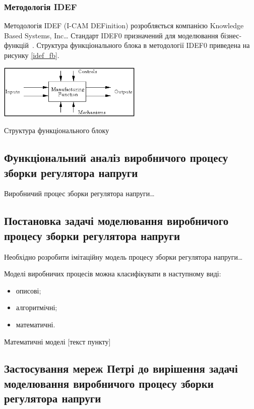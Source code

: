\subsubsection{Методологія IDEF}
Методологія IDEF (I-CAM DEFinition) розробляється компанією Knowledge Based Systems, Inc\ldots
Стандарт IDEF0 призначений для моделювання
бізнес-функцій~\cite{Sommerville_2010}. Структура функціонального блока в методології IDEF0 приведена на рисунку
\ref{idef_fb}.

\begin{stdfigure}
\includegraphics[width=2.7in]{images/idef_fb.png}
\caption{Структура функціонального блоку}
\label{idef_fb}
\end{stdfigure}

\subsection{Функціональний аналіз виробничого процесу зборки регулятора напруги}

Виробничий процес зборки регулятора напруги\ldots

\subsection{Постановка задачі моделювання виробничого процесу зборки регулятора
напруги}

Необхідно розробити імітаційну модель процесу зборки регулятора напруги\ldots

Моделі виробничих процесів можна класифікувати в наступному виді:
\begin{itemize}
\item описові;
\item алгоритмічні;
\item математичні.
\end{itemize}

Математичні моделі [текст пункту]


\subsection{Застосування мереж Петрі до вирішення задачі моделювання
виробничого процесу зборки регулятора напруги} 

